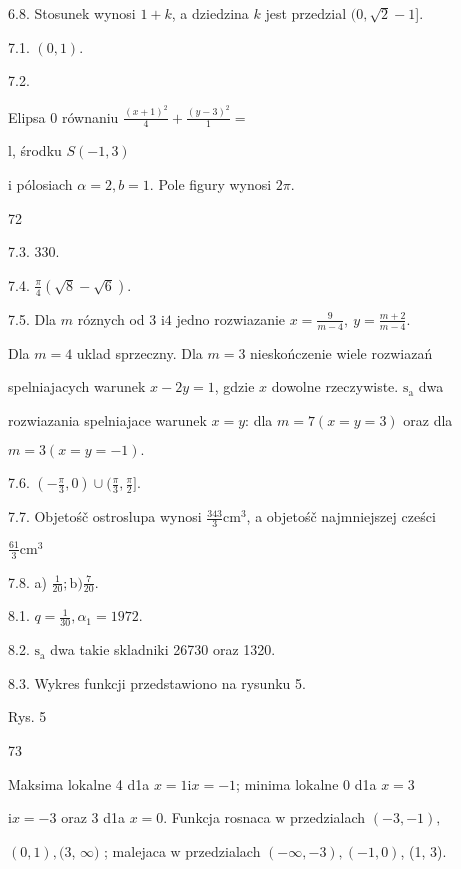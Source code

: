 \documentclass[a4paper,12pt]{article}
\begin{document}
6.8. Stosunek wynosi $1+k$, a dziedzina $k$ jest przedzial $(0,\sqrt{2}-1$].

7.1. $(0,1).$

7.2.

Elipsa $0$ równaniu $\displaystyle \frac{(x+1)^{2}}{4} + \displaystyle \frac{(y-3)^{2}}{1} =$

l, środku $S(-1,3)$

$\mathrm{i}$ pólosiach $\alpha=2, b=1$. Pole figury wynosi $2\pi.$





72

7.3. 330.

7.4. $\displaystyle \frac{\pi}{4}(\sqrt{8}-\sqrt{6}).$

7.5. Dla $m$ róznych od 3 $\mathrm{i}4$ jedno rozwiazanie $x=\displaystyle \frac{9}{m-4},\ y=\displaystyle \frac{m+2}{m-4}$.

Dla $m = 4$ uklad sprzeczny. Dla $m = 3$ nieskończenie wiele rozwiazań

spelniajacych warunek $x-2y = 1$, gdzie $x$ dowolne rzeczywiste. $\mathrm{s}_{\mathrm{a}}$ dwa

rozwiazania spelniajace warunek $x=y$: dla $m=7 (x=y=3)$ oraz dla

$m=3 (x=y=-1).$

7.6. $(-\displaystyle \frac{\pi}{3},0)\cup(\frac{\pi}{3},\frac{\pi}{2}].$

7.7. Objetośč ostroslupa wynosi $\displaystyle \frac{343}{3}\mathrm{c}\mathrm{m}^{3}$, a objetośč najmniejszej cześci

$\displaystyle \frac{61}{3}\mathrm{c}\mathrm{m}^{3}$

7.8. a) $\displaystyle \frac{1}{20};\mathrm{b}) \displaystyle \frac{7}{20}.$

8.1. $q=\displaystyle \frac{1}{30}, \alpha_{1}=1972.$

8.2. $\mathrm{s}_{\mathrm{a}}$ dwa takie skladniki 26730 oraz 1320.

8.3. Wykres funkcji przedstawiono na rysunku 5.

Rys. 5





73

Maksima lokalne 4 d1a $x = 1 \mathrm{i}x = -1$; minima lokalne 0 d1a $x = 3$

$\mathrm{i} x = -3$ oraz 3 d1a $x = 0$. Funkcja rosnaca $\mathrm{w}$ przedzialach $(-3,-1),$

$(0,1), ($3, $\infty)$ ; malejaca $\mathrm{w}$ przedzialach $(-\infty,-3), (-1,0)$, (1, 3).
\end{document}
